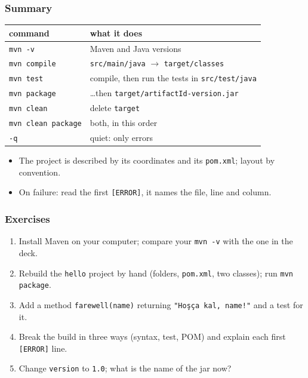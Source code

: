 \documentclass[aspectratio=169,10pt,compress]{beamer}
\begin{document}
\begin{frame}[t,fragile] \frametitle{Summary}
  \begin{center}\small
  \begin{tabular}{@{}L{0.32\textwidth}L{0.6\textwidth}@{}}
    \toprule
    \textbf{command}            & \textbf{what it does} \\
    \midrule
    \texttt{mvn -v}             & Maven and Java versions \\
    \texttt{mvn compile}        & \texttt{src/main/java} $\to$ \texttt{target/classes} \\
    \texttt{mvn test}           & compile, then run the tests in \texttt{src/test/java} \\
    \texttt{mvn package}        & \dots then \texttt{target/artifactId-version.jar} \\
    \texttt{mvn clean}          & delete \texttt{target} \\
    \texttt{mvn clean package}  & both, in this order \\
    \texttt{-q}                 & quiet: only errors \\
    \bottomrule
  \end{tabular}
  \end{center}
  \begin{itemize}\small
    \item The project is described by its coordinates and its \texttt{pom.xml}; layout by convention.
    \item On failure: read the first \texttt{[ERROR]}, it names the file, line and column.
  \end{itemize}
\end{frame}




\begin{frame}[t,fragile] \frametitle{Exercises}
  \begin{enumerate}\small
    \item Install Maven on your computer; compare your \texttt{mvn -v} with the one in the deck.
    \item Rebuild the \texttt{hello} project by hand (folders, \texttt{pom.xml}, two classes); run \texttt{mvn package}.
    \item Add a method \texttt{farewell(name)} returning \texttt{"Hoşça kal, name!"} and a test for it.
    \item Break the build in three ways (syntax, test, POM) and explain each first \texttt{[ERROR]} line.
    \item Change \texttt{version} to \texttt{1.0}; what is the name of the jar now?
  \end{enumerate}
\end{frame}




\begin{frame}[t,fragile]
	\begin{center}
		\vspace{4cm}
	\end{center}
\end{frame}
\end{document}
